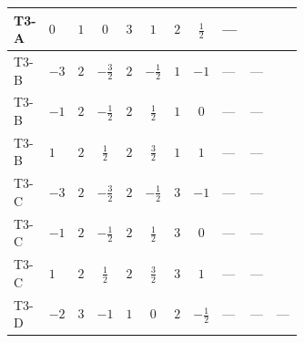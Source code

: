 \documentclass[8pt]{article}
\begin{document}
\begin{landscape}
\begin{longtable}{@{}llcccccc >{\raggedright\arraybackslash}p{0.21\linewidth} >{\raggedright\arraybackslash}p{0.21\linewidth} >{\raggedright\arraybackslash}p{0.21\linewidth}@{}}
\midrule
T3-A & $0$ & $1$ & $0$ & $3$ & $1$ & $2$ & $\frac{1}{2}$ & --- & \scriptsize\adjustbox{max width=\linewidth}{$\begin{gathered} -\frac{33 {g_2}^2 {\lambda_{HS_2}^{(A)}}}{2}\end{gathered}$} & \scriptsize\adjustbox{max width=\linewidth}{$\begin{gathered} +2 {\lambda_1} {\lambda_{HS_2}^{(A)}}\end{gathered}$} \\
\midrule
T3-B & $-3$ & $2$ & $-\frac{3}{2}$ & $2$ & $-\frac{1}{2}$ & $1$ & $-1$ & --- & --- & \scriptsize\adjustbox{max width=\linewidth}{$\begin{gathered} +2 {\lambda_1} {\lambda_{HS_2}^{(A)}}\end{gathered}$} \\
\midrule
T3-B & $-1$ & $2$ & $-\frac{1}{2}$ & $2$ & $\frac{1}{2}$ & $1$ & $0$ & --- & --- & \scriptsize\adjustbox{max width=\linewidth}{$\begin{gathered} +2 {\lambda_1} {\lambda_{HS_2}^{(A)}}\end{gathered}$} \\
\midrule
T3-B & $1$ & $2$ & $\frac{1}{2}$ & $2$ & $\frac{3}{2}$ & $1$ & $1$ & --- & --- & \scriptsize\adjustbox{max width=\linewidth}{$\begin{gathered} +2 {\lambda_1} {\lambda_{HS_2}^{(A)}}\end{gathered}$} \\
\midrule
T3-C & $-3$ & $2$ & $-\frac{3}{2}$ & $2$ & $-\frac{1}{2}$ & $3$ & $-1$ & --- & --- & \scriptsize\adjustbox{max width=\linewidth}{$\begin{gathered} +2 {\lambda_1} {\lambda_{HS_2}^{(A)}}\end{gathered}$} \\
\midrule
T3-C & $-1$ & $2$ & $-\frac{1}{2}$ & $2$ & $\frac{1}{2}$ & $3$ & $0$ & --- & --- & \scriptsize\adjustbox{max width=\linewidth}{$\begin{gathered} +2 {\lambda_1} {\lambda_{HS_2}^{(A)}}\end{gathered}$} \\
\midrule
T3-C & $1$ & $2$ & $\frac{1}{2}$ & $2$ & $\frac{3}{2}$ & $3$ & $1$ & --- & --- & \scriptsize\adjustbox{max width=\linewidth}{$\begin{gathered} +2 {\lambda_1} {\lambda_{HS_2}^{(A)}}\end{gathered}$} \\
\midrule
T3-D & $-2$ & $3$ & $-1$ & $1$ & $0$ & $2$ & $-\frac{1}{2}$ & --- & --- & --- \\

\end{longtable}
\end{landscape}
\end{document}
